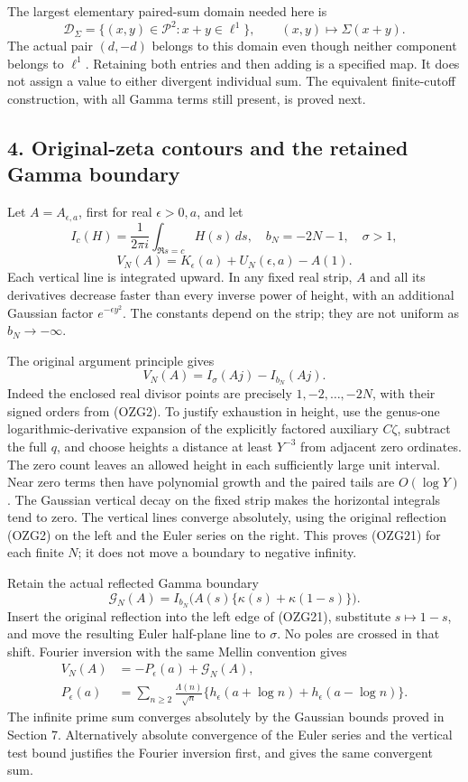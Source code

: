 \documentclass[
  10pt,
  a4paper,
]{article}
\begin{document}
The largest elementary paired-sum domain needed here is \[
\mathcal D_\Sigma=\{(x,y)\in\mathcal P^2:x+y\in\ell^1\},\qquad
(x,y)\longmapsto\Sigma(x+y).
\tag{OZG19}
\] The actual pair \((d,-d)\) belongs to this domain even though neither
component belongs to \(\ell^1\). Retaining both entries and then adding
is a specified map. It does not assign a value to either divergent
individual sum. The equivalent finite-cutoff construction, with all
Gamma terms still present, is proved next.

\subsection{4. Original-zeta contours and the retained Gamma
boundary}\label{original-zeta-contours-and-the-retained-gamma-boundary}

Let \(A=A_{\epsilon,a}\), first for real \(\epsilon>0,a\), and let \[
I_c(H)=\frac1{2\pi i}\int_{\Re s=c}H(s)\,ds,\quad
b_N=-2N-1,\quad \sigma>1,
\] \[
V_N(A)=K_\epsilon(a)+U_N(\epsilon,a)-A(1).
\tag{OZG20}
\] Each vertical line is integrated upward. In any fixed real strip,
\(A\) and all its derivatives decrease faster than every inverse power
of height, with an additional Gaussian factor \(e^{-\epsilon y^2}\). The
constants depend on the strip; they are not uniform as
\(b_N\to-\infty\).

The original argument principle gives \[
V_N(A)=I_\sigma(Aj)-I_{b_N}(Aj).
\tag{OZG21}
\] Indeed the enclosed real divisor points are precisely
\(1,-2,\ldots,-2N\), with their signed orders from (OZG2). To justify
exhaustion in height, use the genus-one logarithmic-derivative expansion
of the explicitly factored auxiliary \(C\zeta\), subtract the full
\(q\), and choose heights a distance at least \(Y^{-3}\) from adjacent
zero ordinates. The zero count leaves an allowed height in each
sufficiently large unit interval. Near zero terms then have polynomial
growth and the paired tails are \(O(\log Y)\). The Gaussian vertical
decay on the fixed strip makes the horizontal integrals tend to zero.
The vertical lines converge absolutely, using the original reflection
(OZG2) on the left and the Euler series on the right. This proves
(OZG21) for each finite \(N\); it does not move a boundary to negative
infinity.

Retain the actual reflected Gamma boundary \[
\mathcal G_N(A)=
I_{b_N}\bigl(A(s)\{\kappa(s)+\kappa(1-s)\}\bigr).
\tag{OZG22}
\] Insert the original reflection into the left edge of (OZG21),
substitute \(s\mapsto1-s\), and move the resulting Euler half-plane line
to \(\sigma\). No poles are crossed in that shift. Fourier inversion
with the same Mellin convention gives \[
\begin{aligned}
V_N(A)&=-P_\epsilon(a)+\mathcal G_N(A),\\
P_\epsilon(a)&=\sum_{n\ge2}\frac{\Lambda(n)}{\sqrt n}
\{h_\epsilon(a+\log n)+h_\epsilon(a-\log n)\}.
\end{aligned}
\tag{OZG23}
\] The infinite prime sum converges absolutely by the Gaussian bounds
proved in Section 7. Alternatively absolute convergence of the Euler
series and the vertical test bound justifies the Fourier inversion
first, and gives the same convergent sum.
\end{document}
